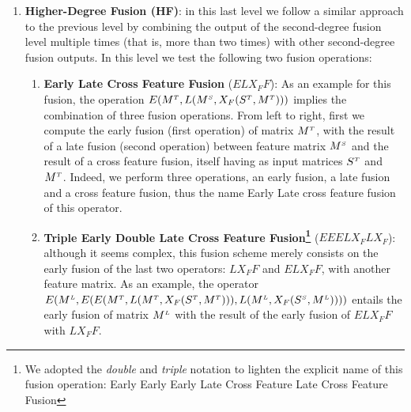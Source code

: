 \begin{enumerate}
\item \textbf{Higher-Degree Fusion (HF)}: in this last level we follow a similar approach to the previous level by combining the output of the second-degree fusion level multiple times (that is, more than two times) with other second-degree fusion outputs. In this level we test the following two fusion operations:
\begin{enumerate}
\item \textbf{Early Late Cross Feature Fusion} ($ELX_FF$): As an example for this fusion, the operation $E(M^{\scriptscriptstyle T}, \allowbreak L(M^{\scriptscriptstyle S}, X_F(S^{\scriptscriptstyle T}, M^{\scriptscriptstyle T})))$ implies the combination of three fusion operations. From left to right, first we compute the early fusion (first operation) of  matrix $M^{\scriptscriptstyle T}$, with the result of a late fusion (second operation) between feature matrix $M^{\scriptscriptstyle S}$ and the result of a cross feature fusion, itself having as input matrices $S^{\scriptscriptstyle T}$ and $M^{\scriptscriptstyle T}$. Indeed, we perform three operations, an early fusion, a late fusion and a cross feature fusion, thus the name Early Late cross feature fusion of this operator.
\item \textbf{Triple Early Double Late Cross Feature Fusion\footnote{We adopted the \textit{double} and \textit{triple} notation to lighten the explicit name of this fusion operation: Early Early Early Late Cross Feature Late Cross Feature Fusion}}
 ($EEELX_FLX_F$): although it seems complex, this fusion scheme merely consists on the early fusion of the last two operators: $LX_FF$ and $ELX_FF$, with another feature matrix. As an example, the operator  $E(M^{\scriptscriptstyle L}, E(E(M^{\scriptscriptstyle T},  L(M^{\scriptscriptstyle T}, X_F(S^{\scriptscriptstyle T}, M^{\scriptscriptstyle T}))),\allowbreak L(M^{\scriptscriptstyle L}, X_F(S^{\scriptscriptstyle S}, M^{\scriptscriptstyle L}))))$ entails the early fusion of matrix $M^{\scriptscriptstyle L}$ with the result of the early fusion of $ELX_FF$ with $LX_FF$.
\end{enumerate}

	
	\end{enumerate}   



